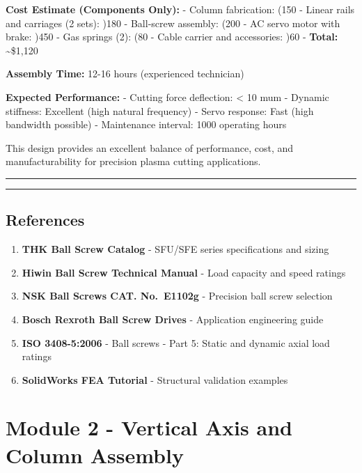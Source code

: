 \documentclass[
]{article}
\providecommand{\tightlist}{%
  \setlength{\itemsep}{0pt}\setlength{\parskip}{0pt}}
\begin{document}
\textbf{Cost Estimate (Components Only):} - Column fabrication: (150 -
Linear rails and carriages (2 sets): )180 - Ball-screw assembly: (200 -
AC servo motor with brake: )450 - Gas springs (2): (80 - Cable carrier
and accessories: )60 - \textbf{Total:} \textasciitilde\$1,120

\textbf{Assembly Time:} 12-16 hours (experienced technician)

\textbf{Expected Performance:} - Cutting force deflection: \textless{}
10 mum - Dynamic stiffness: Excellent (high natural frequency) - Servo
response: Fast (high bandwidth possible) - Maintenance interval: 1000
operating hours

This design provides an excellent balance of performance, cost, and
manufacturability for precision plasma cutting applications.

\begin{center}\rule{0.5\linewidth}{0.5pt}\end{center}

\begin{center}\rule{0.5\linewidth}{0.5pt}\end{center}

\subsection{References}\label{references-3}

\begin{enumerate}
\def\labelenumi{\arabic{enumi}.}
\tightlist
\item
  \textbf{THK Ball Screw Catalog} - SFU/SFE series specifications and
  sizing
\item
  \textbf{Hiwin Ball Screw Technical Manual} - Load capacity and speed
  ratings
\item
  \textbf{NSK Ball Screws CAT. No.~E1102g} - Precision ball screw
  selection
\item
  \textbf{Bosch Rexroth Ball Screw Drives} - Application engineering
  guide
\item
  \textbf{ISO 3408-5:2006} - Ball screws - Part 5: Static and dynamic
  axial load ratings
\item
  \textbf{SolidWorks FEA Tutorial} - Structural validation examples
\end{enumerate}

\newpage

\section{Module 2 - Vertical Axis and Column
Assembly}\label{module-2---vertical-axis-and-column-assembly-4}
\end{document}
